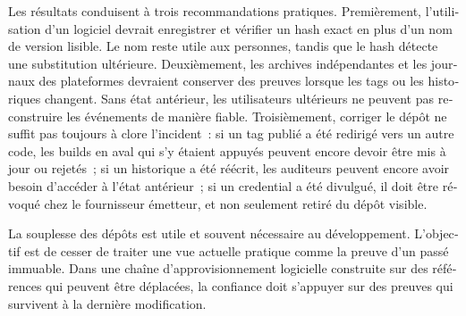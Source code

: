 \begin{otherlanguage}{french}
\begin{SingleSpace}
Les résultats conduisent à trois recommandations pratiques.
Premièrement, l'utilisation d'un logiciel devrait enregistrer et vérifier un hash exact en plus d'un nom de version lisible.
Le nom reste utile aux personnes, tandis que le hash détecte une substitution ultérieure.
Deuxièmement, les archives indépendantes et les journaux des plateformes devraient conserver des preuves lorsque les tags ou les historiques changent.
Sans état antérieur, les utilisateurs ultérieurs ne peuvent pas reconstruire les événements de manière fiable.
Troisièmement, corriger le dépôt ne suffit pas toujours à clore l'incident~: si un tag publié a été redirigé vers un autre code, les builds en aval qui s'y étaient appuyés peuvent encore devoir être mis à jour ou rejetés~; si un historique a été réécrit, les auditeurs peuvent encore avoir besoin d'accéder à l'état antérieur~; si un credential a été divulgué, il doit être révoqué chez le fournisseur émetteur, et non seulement retiré du dépôt visible.

La souplesse des dépôts est utile et souvent nécessaire au développement.
L'objectif est de cesser de traiter une vue actuelle pratique comme la preuve d'un passé immuable.
Dans une chaîne d'approvisionnement logicielle construite sur des références qui peuvent être déplacées, la confiance doit s'appuyer sur des preuves qui survivent à la dernière modification.
\end{SingleSpace}
\end{otherlanguage}
\clearpage

